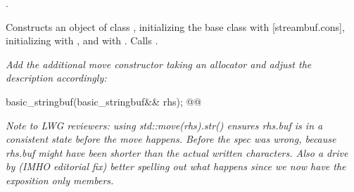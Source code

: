 \documentclass[ebook,11pt,article]{memoir}
\renewcommand{\iref}[1]{[#1]}
\begin{document}
\begin{addedblock}
\begin{itemdescr}
\pnum
\constraints {}.

\pnum
\effects Constructs an object of class , initializing the base class with  \iref{streambuf.cons}, initializing  with , and   with . Calls .

\end{itemdescr}


\end{addedblock}



\textit{Add the additional move constructor taking an allocator and adjust the description accordingly:}

\begin{itemdecl}
basic_stringbuf(basic_stringbuf&& rhs);
@@
\end{itemdecl}

\emph{Note to LWG reviewers: using std::move(rhs).str() ensures rhs.buf is in a consistent state before the move happens. Before the spec was wrong, because rhs.buf might have been shorter than the actual written characters. Also a drive by (IMHO editorial fix) better spelling out what happens since we now have the exposition only members.}
\end{document}
